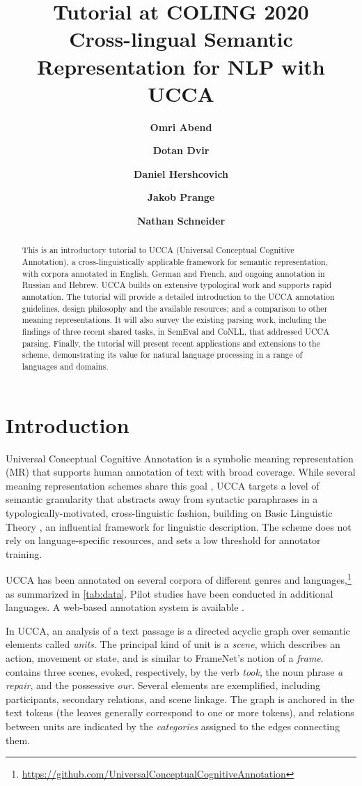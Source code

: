 \documentclass[11pt,a4paper,table]{article}
\title{Tutorial at COLING 2020 \\
Cross-lingual Semantic Representation for NLP with UCCA}
\author[*]{\textbf{Omri Abend}}
\author[*]{\textbf{Dotan Dvir}}
\author[**]{\textbf{Daniel Hershcovich}}
\author[***]{\textbf{Jakob Prange}}
\author[***]{\textbf{Nathan Schneider}}
\affil[*]{Hebrew University of Jerusalem}
\affil[**]{University of Copenhagen}
\affil[***]{Georgetown University}
\affil[ ]{
\texttt{oabend@cs.huji.ac.il},\quad
\texttt{dotan.dvir@mail.huji.ac.il},\quad
\texttt{dh@di.ku.dk}}
\affil[ ]{
\texttt{jakob@cs.georgetown.edu},\quad
\texttt{nathan.schneider@georgetown.edu}
}
\begin{document}
\maketitle

\begin{abstract}
This is an introductory tutorial to UCCA (Universal Conceptual Cognitive Annotation), a cross-linguistically applicable framework for semantic representation, with corpora annotated in English, German and French, and ongoing annotation in Russian and Hebrew. UCCA builds on extensive typological work and supports rapid annotation. The tutorial will provide a detailed introduction to the UCCA annotation guidelines, design philosophy and the available resources; and a comparison to other meaning representations. It will also survey the existing parsing work, including the findings of three recent shared tasks, in SemEval and CoNLL, that addressed UCCA parsing. Finally, the tutorial will present recent applications and extensions to the scheme, demonstrating its value for natural language processing in a range of languages and domains.
\end{abstract}


\section{Introduction}\label{sec:introduction}

Universal Conceptual Cognitive Annotation \cite[UCCA;][]{abend2013universal} 
is a symbolic meaning representation (MR)
that supports human annotation of text with broad coverage.
While several meaning representation schemes share this goal
\citep{abend2017state}, UCCA targets a level of semantic granularity that abstracts away from syntactic paraphrases in a typologically-motivated, cross-linguistic fashion, building on Basic Linguistic Theory \citep{Dixon:basic}, an influential framework for linguistic description.
The scheme does not rely on language-specific resources, and sets a low
threshold for annotator training.

UCCA has been annotated on several corpora of different genres and
languages,\footnote{\tiny\url{https://github.com/UniversalConceptualCognitiveAnnotation}} as summarized in \cref{tab:data}.
Pilot studies have been conducted in additional languages.
A web-based annotation system is available \cite{abend2017uccaapp}.

In UCCA, an analysis of a text passage is a directed acyclic graph
over semantic elements called \textit{units}.
The principal kind of unit is a \textit{scene},
which describes an action, movement or state, and is similar to FrameNet's notion of a {\it frame}.
 contains three scenes, evoked, respectively,
by the verb \textit{took},
the noun phrase \textit{a repair}, and the possessive \textit{our}.
Several elements are exemplified, including participants,
secondary relations, and scene linkage.
The graph is anchored in the text tokens (the leaves generally correspond to one or more tokens), and relations between units
are indicated by the \textit{categories} assigned to the edges connecting them.
\end{document}
